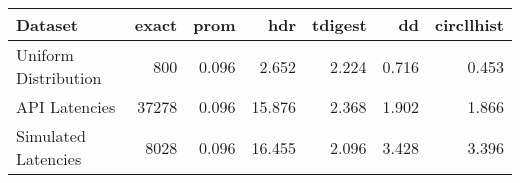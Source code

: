 \begin{tabular}{lrrrrrr}
\toprule
Dataset              &     exact &  prom &      hdr &  tdigest &    dd &  circllhist \\
\midrule
Uniform Distribution &    800 & 0.096  &   2.652 &  2.224 &  0.716 & 0.453 \\
API Latencies        &  37278 & 0.096  &  15.876 &  2.368 &  1.902 & 1.866 \\
Simulated Latencies  &   8028 & 0.096  &  16.455 &  2.096 &  3.428 & 3.396 \\
\bottomrule
\end{tabular}
